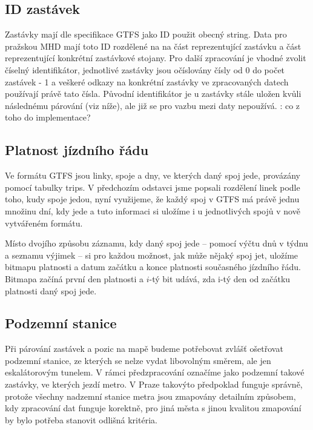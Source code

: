 \subsection{ID zastávek}
Zastávky mají dle specifikace GTFS jako ID použit obecný string. Data pro
pražskou MHD mají toto ID rozdělené na na část reprezentující zastávku a část
reprezentující konkrétní zastávkové stojany. Pro další zpracování je vhodné
zvolit číselný identifikátor, jednotlivé zastávky jsou očíslovány čísly od 0 do
počet zastávek - 1 a veškeré odkazy na konkrétní zastávky ve zpracovaných datech
používají právě tato čísla. Původní identifikátor je u zastávky stále uložen
kvůli následnému párování (viz níže), ale již se pro vazbu mezi daty nepoužívá.
\TODO: co z toho do implementace?

\subsection{Platnost jízdního řádu}
Ve formátu GTFS jsou linky, spoje a dny, ve kterých daný spoj jede, provázány
pomocí tabulky trips. V předchozím odstavci jsme popsali rozdělení linek podle
toho, kudy spoje jedou, nyní využijeme, že každý spoj v GTFS má právě jednu
množinu dní, kdy jede a tuto informaci si uložíme i u jednotlivých spojů v nově
vytvářeném formátu.

Místo dvojího způsobu záznamu, kdy daný spoj jede -- pomocí výčtu dnů v týdnu a
seznamu výjimek -- si pro každou možnost, jak může nějaký spoj jet, uložíme
bitmapu platnosti a datum začátku a konce platnosti současného jízdního řádu. 
Bitmapa začíná první den platnosti a $i$-tý bit udává, zda i-tý den od začátku
platnosti daný spoj jede.  

\subsection{Podzemní stanice}
Při párování zastávek a pozic na mapě budeme potřebovat zvlášť ošetřovat
podzemní stanice, ze kterých se nelze vydat libovolným směrem, ale jen
eskalátorovým tunelem. V rámci předzpracování označíme jako podzemní takové
zastávky, ve kterých jezdí metro. V Praze takovýto předpoklad funguje správně,
protože všechny nadzemní stanice metra jsou zmapovány detailním způsobem, kdy
zpracování dat funguje korektně, pro jiná města s jinou kvalitou zmapování by
bylo potřeba stanovit odlišná kritéria.


